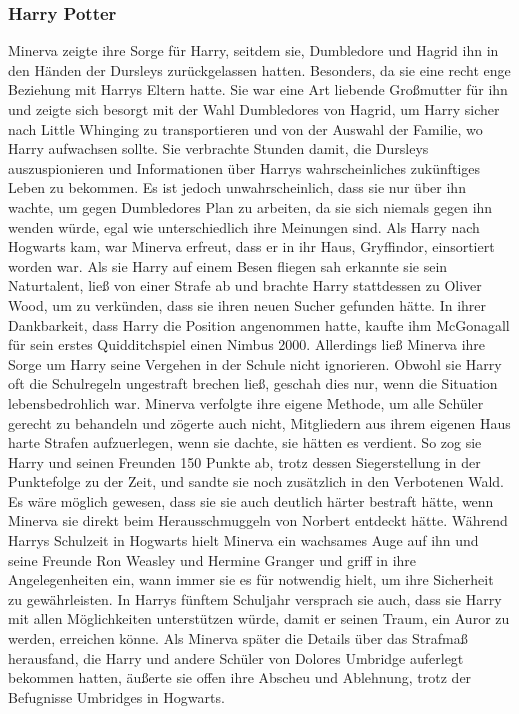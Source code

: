 \documentclass[a4paper, 10pt]{article}
\begin{document}
\subsubsection*{\large Harry Potter}
Minerva zeigte ihre Sorge für Harry, seitdem sie, Dumbledore und Hagrid ihn in den Händen der Dursleys zurückgelassen hatten. Besonders, da sie eine recht enge Beziehung mit Harrys Eltern hatte. Sie war eine Art liebende Großmutter für ihn und zeigte sich besorgt mit der Wahl Dumbledores von Hagrid, um Harry sicher nach Little Whinging zu transportieren und von der Auswahl der Familie, wo Harry aufwachsen sollte. Sie verbrachte Stunden damit, die Dursleys auszuspionieren und Informationen über Harrys wahrscheinliches zukünftiges Leben zu bekommen. Es ist jedoch unwahrscheinlich, dass sie nur über ihn wachte, um gegen Dumbledores Plan zu arbeiten, da sie sich niemals gegen ihn wenden würde, egal wie unterschiedlich ihre Meinungen sind.
\vspace{10pt}
\newline
{}  
Als Harry nach Hogwarts kam, war Minerva erfreut, dass er in ihr Haus, Gryffindor, einsortiert worden war. Als sie Harry auf einem Besen fliegen sah erkannte sie sein Naturtalent, ließ von einer Strafe ab und brachte Harry stattdessen zu Oliver Wood, um zu verkünden, dass sie ihren neuen Sucher gefunden hätte. In ihrer Dankbarkeit, dass Harry die Position angenommen hatte, kaufte ihm McGonagall für sein erstes Quidditchspiel einen Nimbus 2000.
\vspace{10pt}
\newline
{}  
Allerdings ließ Minerva ihre Sorge um Harry seine Vergehen in der Schule nicht ignorieren. Obwohl sie Harry oft die Schulregeln ungestraft brechen ließ, geschah dies nur, wenn die Situation lebensbedrohlich war. Minerva verfolgte ihre eigene Methode, um alle Schüler gerecht zu behandeln und zögerte auch nicht, Mitgliedern aus ihrem eigenen Haus harte Strafen aufzuerlegen, wenn sie dachte, sie hätten es verdient. So zog sie Harry und seinen Freunden 150 Punkte ab, trotz dessen Siegerstellung in der Punktefolge zu der Zeit, und sandte sie noch zusätzlich in den Verbotenen Wald. Es wäre möglich gewesen, dass sie sie auch deutlich härter bestraft hätte, wenn Minerva sie direkt beim Herausschmuggeln von Norbert entdeckt hätte.
\vspace{10pt}
\newline
{}  
Während Harrys Schulzeit in Hogwarts hielt Minerva ein wachsames Auge auf ihn und seine Freunde Ron Weasley und Hermine Granger  und griff in ihre Angelegenheiten ein, wann immer sie es für notwendig hielt, um ihre Sicherheit zu gewährleisten. In Harrys fünftem Schuljahr versprach sie auch, dass sie Harry mit allen Möglichkeiten unterstützen würde, damit er seinen Traum, ein Auror zu werden, erreichen könne. Als Minerva später die Details über das Strafmaß herausfand, die Harry und andere Schüler von Dolores Umbridge auferlegt bekommen hatten, äußerte sie offen ihre Abscheu und Ablehnung, trotz der Befugnisse Umbridges in Hogwarts.
\end{document}
